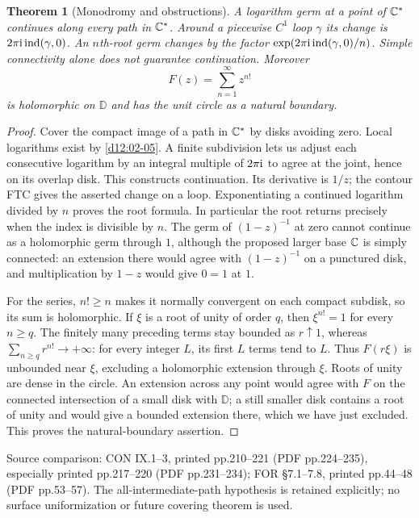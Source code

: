 \documentclass[11pt,a4paper,openany]{book}
\newtheorem{theorem}{Theorem}[chapter]
\theoremstyle{definition}
\theoremstyle{remark}\newtheorem{remark}[theorem]{Remark}
\newcommand{\D}{\mathbb D}\newcommand{\Chat}{\widehat{\mathbb C}}
\newcommand{\family}[1]{}
\newcommand{\source}[1]{\par\begingroup\small\sffamily\color{black!65}Source comparison: #1\par\endgroup}
\begin{document}
\begin{theorem}[Monodromy and obstructions]\label{d12:19-07}\family{D12.19.07}
A logarithm germ at a point of $\mathbb C^*$ continues along every path in
$\mathbb C^*$. Around a piecewise $C^1$ loop $\gamma$ its change is
$2\pi\mathrm i\operatorname{ind}(\gamma,0)$. An $n$th-root germ changes by the factor
$\exp(2\pi\mathrm i\operatorname{ind}(\gamma,0)/n)$. Simple connectivity alone does not
guarantee continuation. Moreover
\[
                         F(z)=\sum_{n=1}^\infty z^{n!}
\]
is holomorphic on $\D$ and has the unit circle as a natural boundary.
\end{theorem}
\begin{proof}
Cover the compact image of a path in $\mathbb C^*$ by disks avoiding zero. Local
logarithms exist by \cref{d12:02-05}. A finite subdivision lets us adjust
each consecutive logarithm by an integral multiple of $2\pi\mathrm i$ to agree
at the joint, hence on its overlap disk. This constructs continuation.
Its derivative is $1/z$; the contour FTC gives the asserted change on a
loop. Exponentiating a continued logarithm divided by $n$ proves the root
formula. In particular the root returns precisely when the index is
divisible by $n$. The germ of $(1-z)^{-1}$ at zero cannot continue as a
holomorphic germ through $1$, although the proposed larger base $\mathbb C$ is
simply connected: an extension there would agree with $(1-z)^{-1}$ on a
punctured disk, and multiplication by $1-z$ would give $0=1$ at $1$.

For the series, $n!\ge n$ makes it normally convergent on each compact
subdisk, so its sum is holomorphic. If $\xi$ is a root of unity of order
$q$, then $\xi^{n!}=1$ for every $n\ge q$. The finitely many preceding
terms stay bounded as $r\uparrow1$, whereas
$\sum_{n\ge q}r^{n!}\to+\infty$: for every integer $L$, its first $L$
terms tend to $L$. Thus $F(r\xi)$ is unbounded near $\xi$, excluding a
holomorphic extension through $\xi$. Roots of unity are dense in the
circle. An extension across any point would agree with $F$ on the
connected intersection of a small disk with $\D$; a still smaller disk
contains a root of unity and would give a bounded extension there, which
we have just excluded. This proves the natural-boundary assertion.
\end{proof}
\source{CON IX.1--3, printed pp.210--221 (PDF pp.224--235),
especially printed pp.217--220 (PDF pp.231--234);
FOR \S7.1--7.8, printed pp.44--48 (PDF pp.53--57).
The all-intermediate-path hypothesis is retained explicitly; no surface
uniformization or future covering theorem is used.}
\end{document}
